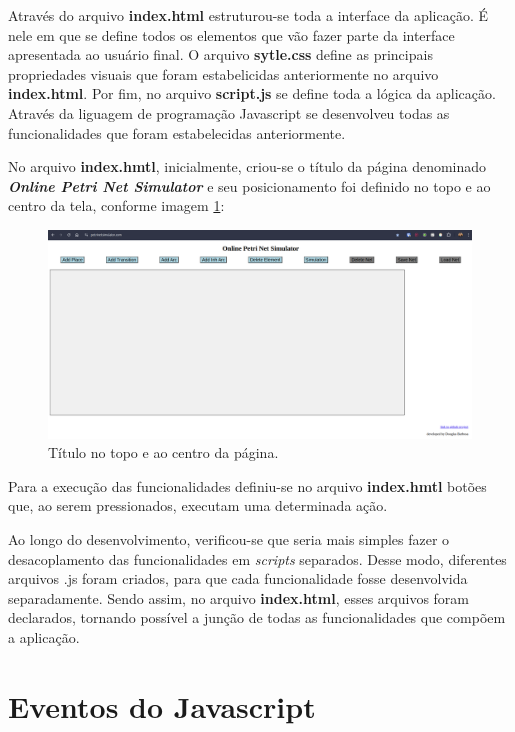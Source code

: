 \documentclass[
	12pt,				%
	openright,			%
	oneside,			%
	a4paper,			%
	english,			%
	brazil				%
	]{abntex2}
\begin{document}
Através do arquivo \textbf{index.html} estruturou-se toda a interface da aplicação. É nele em que se define todos os elementos que vão fazer parte da interface apresentada ao usuário final. O arquivo \textbf{sytle.css} define as principais propriedades visuais que foram estabelicidas anteriormente no arquivo \textbf{index.html}. Por fim, no arquivo \textbf{script.js} se define toda a lógica da aplicação. Através da liguagem de programação Javascript se desenvolveu todas as funcionalidades que foram estabelecidas anteriormente. 

No arquivo \textbf{index.hmtl}, inicialmente, criou-se o título da página denominado \textbf{\textit{Online Petri Net Simulator}} e seu posicionamento foi definido no topo e ao centro da tela, conforme imagem \ref{fig:titulo_topo_centro}:

\begin{figure}[ht] 
	\centering
	\includegraphics[scale=0.3]{figuras/tela_inicial_titulo_topo_centro.png}
	\caption[Título no topo e ao centro da página]{Título no topo e ao centro da página.}
	\label{fig:titulo_topo_centro}
\end{figure}

Para a execução das funcionalidades definiu-se no arquivo \textbf{index.hmtl} botões que, ao serem pressionados, executam uma determinada ação. 

Ao longo do desenvolvimento, verificou-se que seria mais simples fazer o desacoplamento das funcionalidades em \textit{scripts} separados. Desse modo, diferentes arquivos .js foram criados, para que cada funcionalidade fosse desenvolvida separadamente. Sendo assim, no arquivo \textbf{index.html}, esses arquivos foram declarados, tornando possível a junção de todas as funcionalidades que compõem a aplicação. 

\section{Eventos do Javascript}
\end{document}
